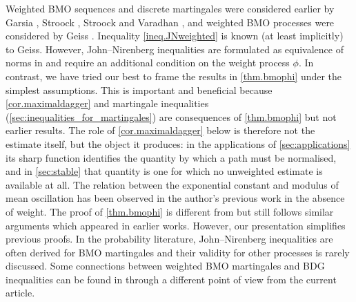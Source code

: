 \documentclass[12pt,oneside,reqno,fleqn]{amsart}
\numberwithin{equation}{section}
\theoremstyle{remark}
\newcommand{\1}{{\mathbf 1}}
\begin{document}
	Weighted BMO sequences and discrete martingales were considered earlier by Garsia \cite{MR0448538}, Stroock \cite{MR341601}, Stroock and Varadhan \cite{MR2190038}, and weighted BMO processes were considered by Geiss \cite{MR2136865}. 
	Inequality \eqref{ineq.JNweighted} is known (at least implicitly) to Geiss. However, John--Nirenberg inequalities are formulated as equivalence of norms in \cite{MR2136865} and require an additional condition on the weight process $\phi$.
	In contrast, we have tried our best to frame the results in \cref{thm.bmophi} under the simplest assumptions. This is important and beneficial because \cref{cor.maximaldagger} and martingale inequalities (\cref{sec:inequalities_for_martingales}) are consequences of \cref{thm.bmophi} but not earlier results. The role of \cref{cor.maximaldagger} below is therefore not the estimate itself, but the object it produces: in the applications of \cref{sec:applications} its sharp function identifies the quantity by which a path must be normalised, and in \cref{sec:stable} that quantity is one for which no unweighted estimate is available at all.
	The relation between the exponential constant and modulus of mean oscillation has been observed in the author's previous work \cite{le2022stochastic} in the absence of weight. The proof of \cref{thm.bmophi} is different from \cite{le2022stochastic} but still follows similar arguments which appeared in earlier works. However, our presentation simplifies previous proofs.
	In the probability literature,
	John--Nirenberg inequalities are often derived for BMO martingales and their validity for other processes is rarely discussed. Some connections between weighted BMO martingales and BDG inequalities can be found in \cite{MR0448538} through a different point of view from the current article.

\end{document}
